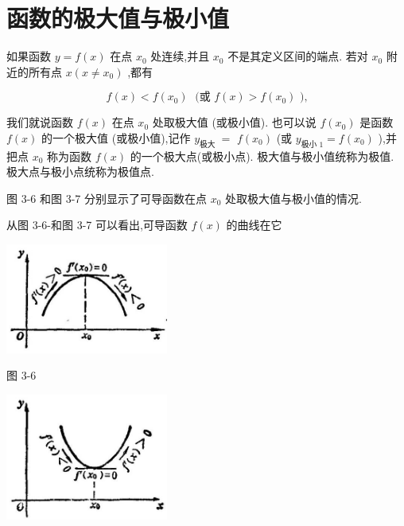 \documentclass[lang=cn,newtx,10pt,scheme=chinese]{elegantbook}
\begin{document}
\section{函数的极大值与极小值}

\begin{definition}[函数的极值点]

如果函数 \(y = f\left( x\right)\) 在点 \({x}_{0}\) 处连续,并且 \({x}_{0}\) 不是其定义区间的端点. 若对 \({x}_{0}\) 附近的所有点 \(x\left( {x \neq {x}_{0}}\right)\) ,都有

\[
f\left( x\right) < f\left( {x}_{0}\right) \;\text{ (或 }f\left( x\right) > f\left( {x}_{0}\right) \text{ ),}
\]

我们就说函数 \(f\left( x\right)\) 在点 \({x}_{0}\) 处取极大值 (或极小值). 也可以说 \(f\left( {x}_{0}\right)\) 是函数 \(f\left( x\right)\) 的一个极大值 (或极小值),记作 \({y}_{\text{极大 }} =\) \(f\left( {x}_{0}\right)\) (或 \({y}_{\text{极小 }1} = f\left( {x}_{0}\right)\) ),并把点 \({x}_{0}\) 称为函数 \(f\left( x\right)\) 的一个极大点(或极小点). 极大值与极小值统称为极值. 极大点与极小点统称为极值点.

\end{definition}

图 3-6 和图 3-7 分别显示了可导函数在点 \({x}_{0}\) 处取极大值与极小值的情况.

从图 3-6-和图 3-7 可以看出,可导函数 \(f\left( x\right)\) 的曲线在它

\begin{center}
\includegraphics[max width=0.4\textwidth]{images/01912c18-5c3f-733d-b775-749ba9897a9d_141_386711.jpg}
\end{center}

图 3-6

\begin{center}
\includegraphics[max width=0.4\textwidth]{images/01912c18-5c3f-733d-b775-749ba9897a9d_141_950727.jpg}
\end{center}
\end{document}
